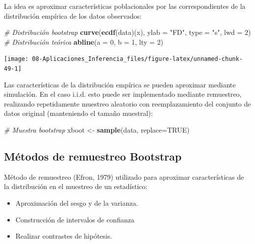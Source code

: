 \documentclass[
]{book}
\newenvironment{Shaded}{\begin{snugshade}}{\end{snugshade}}
\newcommand{\CommentTok}[1]{\textcolor[rgb]{0.56,0.35,0.01}{\textit{#1}}}
\newcommand{\DataTypeTok}[1]{\textcolor[rgb]{0.13,0.29,0.53}{#1}}
\newcommand{\DecValTok}[1]{\textcolor[rgb]{0.00,0.00,0.81}{#1}}
\newcommand{\KeywordTok}[1]{\textcolor[rgb]{0.13,0.29,0.53}{\textbf{#1}}}
\newcommand{\NormalTok}[1]{#1}
\newcommand{\OtherTok}[1]{\textcolor[rgb]{0.56,0.35,0.01}{#1}}
\newcommand{\StringTok}[1]{\textcolor[rgb]{0.31,0.60,0.02}{#1}}
\theoremstyle{break}
\theoremstyle{definition}
\theoremstyle{definition}
\theoremstyle{definition}
\theoremstyle{remark}
\begin{document}
La idea es aproximar características poblacionales por las correspondientes de la distribución empírica de los datos observados:

\begin{Shaded}
\begin{Highlighting}[]
 \CommentTok{# Distribución bootstrap}
\KeywordTok{curve}\NormalTok{(}\KeywordTok{ecdf}\NormalTok{(data)(x), }\DataTypeTok{ylab =} \StringTok{"FD"}\NormalTok{, }\DataTypeTok{type =} \StringTok{"s"}\NormalTok{, }\DataTypeTok{lwd =} \DecValTok{2}\NormalTok{)}
\CommentTok{# Distribución teórica}
\KeywordTok{abline}\NormalTok{(}\DataTypeTok{a =} \DecValTok{0}\NormalTok{, }\DataTypeTok{b =} \DecValTok{1}\NormalTok{, }\DataTypeTok{lty =} \DecValTok{2}\NormalTok{) }
\end{Highlighting}
\end{Shaded}

\begin{center}\texttt{[image: 08-Aplicaciones\_Inferencia\_files/figure-latex/unnamed-chunk-49-1]} \end{center}

Las características de la distribución empírica se pueden aproximar mediante simulación.
En el caso i.i.d. esto puede ser implementado mediante remuestreo,
realizando repetidamente muestreo aleatorio con reemplazamiento
del conjunto de datos original (manteniendo el tamaño muestral):

\begin{Shaded}
\begin{Highlighting}[]
 \CommentTok{# Muestra bootstrap}
\NormalTok{xboot <-}\StringTok{ }\KeywordTok{sample}\NormalTok{(data, }\DataTypeTok{replace=}\OtherTok{TRUE}\NormalTok{)}
\end{Highlighting}
\end{Shaded}

\hypertarget{muxe9todos-de-remuestreo-bootstrap}{%
\subsection{Métodos de remuestreo Bootstrap}\label{muxe9todos-de-remuestreo-bootstrap}}

Método de remuestreo (Efron, 1979) utilizado para aproximar
características de la distribución en el muestreo de un estadístico:

\begin{itemize}
\item
  Aproximación del sesgo y de la varianza.
\item
  Construcción de intervalos de confianza
\item
  Realizar contrastes de hipótesis.
\end{itemize}
\end{document}

